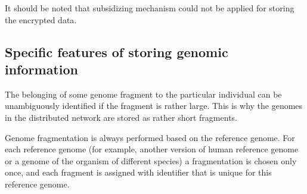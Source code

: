 \begin{note}
It should be noted that subsidizing mechanism could not be applied for storing the encrypted data.
\end{note}



\subsection{Specific features of storing genomic information}
The belonging of some genome fragment to the particular individual can be unambiguously identified if the fragment is rather large. This is why the genomes in the distributed network are stored as rather short fragments.

Genome fragmentation is always performed based on the reference genome. For each reference genome (for example, another version of human reference genome or a genome of the organism of different species) a fragmentation is chosen only once, and each fragment is assigned with identifier that is unique for this reference genome.
%
%
%
%
%
%
%
%
%
%
